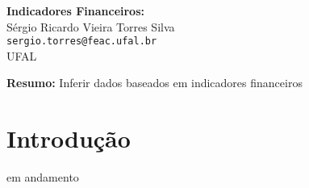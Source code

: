\documentclass[12pt,a4paper]{article}
\begin{document}
	
	\begin{center}
		\LARGE \textbf{Indicadores Financeiros:   } \\[1cm]
		
		\large
		Sérgio Ricardo Vieira Torres Silva\\
		\texttt{sergio.torres@feac.ufal.br}\\
		UFAL\\[0.5cm]
		
	
	\end{center}
	
	\vspace{1cm}
	
	\noindent \textbf{Resumo:} Inferir dados baseados em indicadores financeiros 
	
	
	\section{Introdução}
	
	\hspace*{1.5cm} em andamento
\end{document}
